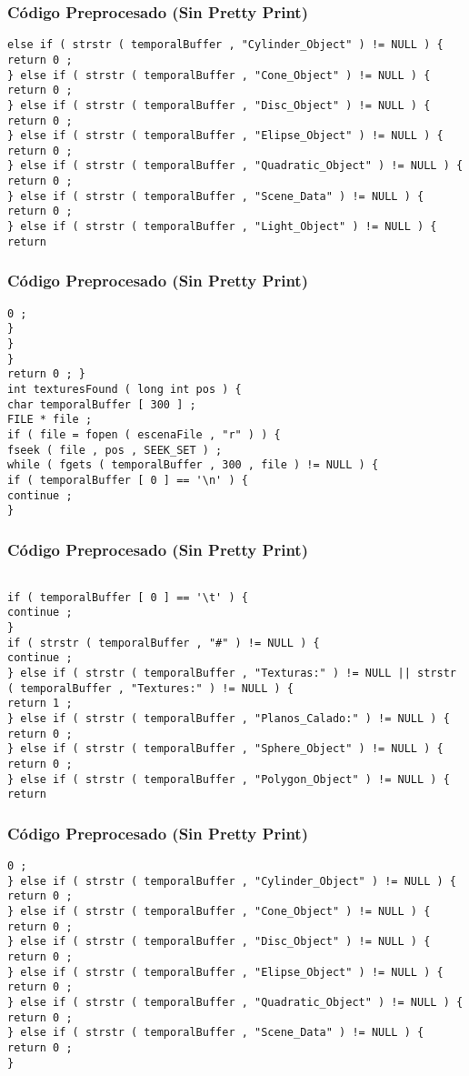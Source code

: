 \documentclass{beamer}
\begin{document}
\begin{frame}[fragile]
\frametitle{C\'odigo Preprocesado (Sin Pretty Print)}
\begin{lstlisting}[style=CStyle]
else if ( strstr ( temporalBuffer , "Cylinder_Object" ) != NULL ) { 
return 0 ; 
} else if ( strstr ( temporalBuffer , "Cone_Object" ) != NULL ) { 
return 0 ; 
} else if ( strstr ( temporalBuffer , "Disc_Object" ) != NULL ) { 
return 0 ; 
} else if ( strstr ( temporalBuffer , "Elipse_Object" ) != NULL ) { 
return 0 ; 
} else if ( strstr ( temporalBuffer , "Quadratic_Object" ) != NULL ) { 
return 0 ; 
} else if ( strstr ( temporalBuffer , "Scene_Data" ) != NULL ) { 
return 0 ; 
} else if ( strstr ( temporalBuffer , "Light_Object" ) != NULL ) { 
return \end{lstlisting}
\end{frame}
\begin{frame}[fragile]
\frametitle{C\'odigo Preprocesado (Sin Pretty Print)}
\begin{lstlisting}[style=CStyle]
0 ; 
} 
} 
} 
return 0 ; } 
int texturesFound ( long int pos ) { 
char temporalBuffer [ 300 ] ; 
FILE * file ; 
if ( file = fopen ( escenaFile , "r" ) ) { 
fseek ( file , pos , SEEK_SET ) ; 
while ( fgets ( temporalBuffer , 300 , file ) != NULL ) { 
if ( temporalBuffer [ 0 ] == '\n' ) { 
continue ; 
} \end{lstlisting}
\end{frame}
\begin{frame}[fragile]
\frametitle{C\'odigo Preprocesado (Sin Pretty Print)}
\begin{lstlisting}[style=CStyle]

if ( temporalBuffer [ 0 ] == '\t' ) { 
continue ; 
} 
if ( strstr ( temporalBuffer , "#" ) != NULL ) { 
continue ; 
} else if ( strstr ( temporalBuffer , "Texturas:" ) != NULL || strstr ( temporalBuffer , "Textures:" ) != NULL ) { 
return 1 ; 
} else if ( strstr ( temporalBuffer , "Planos_Calado:" ) != NULL ) { 
return 0 ; 
} else if ( strstr ( temporalBuffer , "Sphere_Object" ) != NULL ) { 
return 0 ; 
} else if ( strstr ( temporalBuffer , "Polygon_Object" ) != NULL ) { 
return \end{lstlisting}
\end{frame}
\begin{frame}[fragile]
\frametitle{C\'odigo Preprocesado (Sin Pretty Print)}
\begin{lstlisting}[style=CStyle]
0 ; 
} else if ( strstr ( temporalBuffer , "Cylinder_Object" ) != NULL ) { 
return 0 ; 
} else if ( strstr ( temporalBuffer , "Cone_Object" ) != NULL ) { 
return 0 ; 
} else if ( strstr ( temporalBuffer , "Disc_Object" ) != NULL ) { 
return 0 ; 
} else if ( strstr ( temporalBuffer , "Elipse_Object" ) != NULL ) { 
return 0 ; 
} else if ( strstr ( temporalBuffer , "Quadratic_Object" ) != NULL ) { 
return 0 ; 
} else if ( strstr ( temporalBuffer , "Scene_Data" ) != NULL ) { 
return 0 ; 
} \end{lstlisting}
\end{frame}
\end{document}
